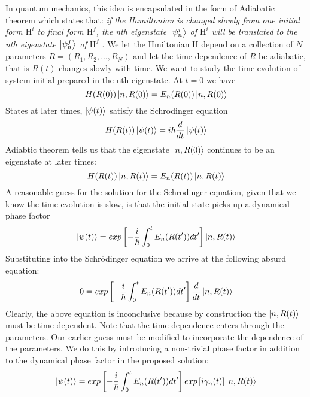 In quantum mechanics, this idea is encapsulated in the form of
Adiabatic theorem which states that: \textit{if the Hamiltonian is changed slowly from one initial form $ \mathrm{H}^i $ to final form $ \mathrm{H}^f $, the nth eigenstate $ \ket{\psi^i_n} $ of  $ \mathrm{H}^i $ will be translated to the nth eigenstate $\ket{\psi^f_n}$ of $ \mathrm{H}^f $ }. We let the Hmiltonian $\mathrm{H}$ depend on a collection of $N$ parameters $ R = (R_1, R_2,...,R_N) $ and let the time dependence of $R$ be adiabatic, that is $R(t)$ changes slowly with time. We want to study the time evolution of system initial prepared in the nth eigenstate. At $ t=0 $ we have
\begin{equation}
    H(R(0))\ket{n,R(0)} = E_n(R(0))\ket{n,R(0)}
\end{equation}
States at later times, $ \ket{\psi(t)} $ satisfy the Schrodinger equation
\begin{equation}
    H(R(t))\ket{\psi(t)} = i\hbar\dfrac{d}{dt}\ket{\psi(t)} 
\end{equation}
Adiabtic theorem tells us that the eigenstate $ \ket{n,R(0)} $ continues to be an eigenstate at later times:
\begin{equation}
    H(R(t))\ket{n,R(t)} = E_n(R(t))\ket{n,R(t)}
\end{equation}
A reasonable guess for the solution for the Schrodinger equation, given that we know the time evolution is slow, is that the initial state picks up a dynamical phase factor
\begin{equation}
    \ket{\psi(t)} = exp\left[ -\frac{i}{\hbar}\int^{t}_{0}E_n(R(t'))dt' \right]\ket{n,R(t)}
\end{equation}
Substituting into the Schr{\"o}dinger equation we arrive at the following absurd equation:
\begin{equation}
    0 = exp\left[ -\frac{i}{\hbar}\int^{t}_{0}E_n(R(t'))dt' \right]\dfrac{d}{dt} \ket{n,R(t)}
\end{equation}
Clearly, the above equation is inconclusive because by construction the $\ket{n,R(t)}$ must be time dependent. Note that the time dependence enters through the parameters. Our earlier guess must be modified to incorporate the dependence of the parameters. We do this by introducing a non-trivial phase factor in addition to the dynamical phase factor in the proposed solution:
\begin{equation}
    \ket{\psi(t)} = exp\left[ -\frac{i}{\hbar}\int^{t}_{0}E_n(R(t'))dt' \right]exp\left[ i\gamma _n(t) \right]\ket{n,R(t)}
\end{equation}
